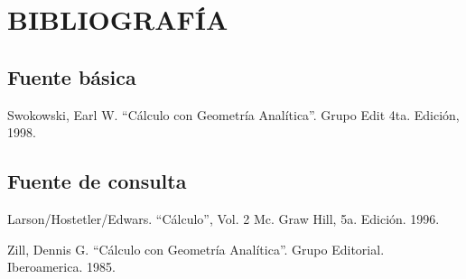 \chapter*{BIBLIOGRAFÍA}

\section*{Fuente básica}

\begin{enumerate}[label={[\arabic*]}]
    \item Swokowski, Earl W. “Cálculo con Geometría Analítica”. Grupo Edit 4ta. Edición, 1998.
\end{enumerate}

\section*{Fuente de consulta}

\begin{enumerate}[resume,label={[\arabic*]}]
    \item Larson/Hostetler/Edwars. “Cálculo”, Vol. 2 Mc. Graw Hill, 5a. Edición. 1996.
    \item Zill, Dennis G. “Cálculo con Geometría Analítica”. Grupo Editorial. Iberoamerica. 1985.
\end{enumerate}

\newpage
\pagestyle{empty}
\,